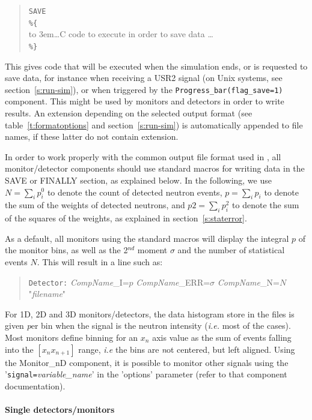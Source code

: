 \begin{quote}
  \texttt{SAVE} \\
  \verb|%{| \\
  \hbox to 3em{}\ldots C code to execute in order to save data \ldots \\
  \verb|%}|
\end{quote}
This gives code that will be executed when the simulation ends, or is requested
to save data, for instance when receiving a USR2 signal (on Unix systems, see
section~\ref{s:run-sim}), or when triggered by the
\texttt{Progress\_bar(flag\_save=1)} component.  This might be used by monitors
and detectors in order to write results.  An extension depending on the selected
output format (see table~\ref{t:formatoptions} and section~\ref{s:run-sim}) is
automatically appended to file names, if these latter do not contain extension.

In order to work properly with the common output file format used in
\MCS, all monitor/detector components should use standard macros for
writing data in the SAVE or FINALLY section, as explained below. In the
following, we use $N = \sum_i p_i^0$ to denote the count of detected
neutron events, $p = \sum_i p_i$ to denote the sum of the weights of
detected neutrons, and $\textit{p2} = \sum_i p_i^2$ to denote the sum of
the squares of the weights, as explained in section~\ref{s:staterror}.

As a default, all monitors using the standard macros will display the
integral $p$ of the monitor bins, as well as the 2$^{nd}$ moment $\sigma$
and the number of statistical events $N$. This will result in a line such as:

\begin{quote}
\verb+Detector:+ {\it CompName}\_I=$p$ {\it CompName}\_ERR=$\sigma$ {\it CompName}\_N=$N$ "{\it filename}"
\end{quote}

For 1D, 2D and 3D monitors/detectors, the data histogram store in the files is
given {\emph per bin} when the signal is the neutron intensity ({\it i.e.} most
of the cases). Most monitors define binning for an $x_n$ axis value as the sum
of events falling into the $[ x_n x_{n+1} ]$ range, {\it i.e} the bins are
{\emph not} centered, but left aligned.  Using the Monitor\_nD component, it is
possible to monitor other signals using the '\verb+signal=+{\it variable\_name}'
in the 'options' parameter (refer to that component documentation).

\paragraph{Single detectors/monitors}
\label{s:DETECTOR_OUT}

